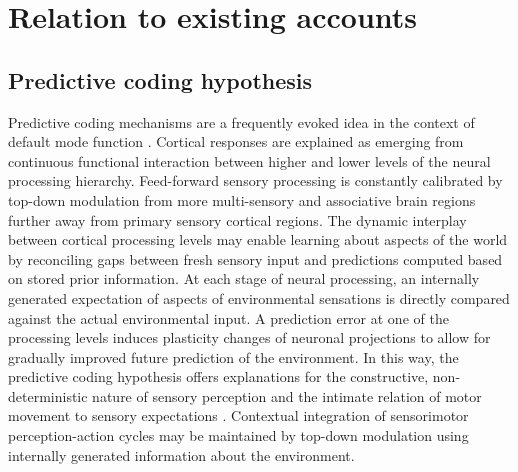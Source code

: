 \documentclass[10pt,letterpaper]{article}
\begin{document}
\section{Relation to existing accounts}

\subsection{Predictive coding hypothesis}
Predictive coding mechanisms
\citep{clark2013whatever, friston2008hierarchical}
are a frequently evoked idea in the context of default mode function
\citep{bar2007}.
Cortical responses are explained as
emerging from continuous functional interaction between
higher and lower levels of the neural processing hierarchy.
Feed-forward sensory processing is constantly calibrated by
top-down modulation from more multi-sensory and associative brain regions
further away from primary sensory cortical regions.
The dynamic interplay between cortical processing levels
may enable learning about aspects of the world by reconciling
gaps between fresh sensory input and predictions computed
based on stored prior information.
At each stage of neural processing,
an internally generated expectation of aspects of environmental sensations is
directly compared against the actual environmental input.
A prediction error at one of the processing levels
induces plasticity changes of neuronal projections
to allow for gradually improved future prediction of the environment.
In this way,
the predictive coding hypothesis offers explanations for
the constructive, non-deterministic nature of sensory perception
\citep{friston2010free, buzsaki2006rhythms} and
the intimate relation of motor movement to sensory expectations
\citep{wolpert1995internal, kording2004bayesian}.
Contextual integration of sensorimotor perception-action cycles
may be maintained by top-down modulation
using internally generated information about the environment.
\end{document}
